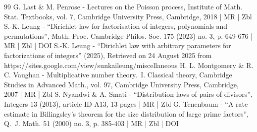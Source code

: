 \documentclass[10pt]{amsart}
\theoremstyle{plain}
\theoremstyle{definition}
\begin{document}
\begin{thebibliography}{99}
G. Last \& M. Penrose - Lectures on the Poisson process, Institute of Math. Stat. Textbooks, vol. 7, Cambridge University Press, Cambridge, 2018 | MR | Zbl
S.-K. Leung - “Dirichlet law for factorisation of integers, polynomials and permutations”, Math. Proc. Cambridge Philos. Soc. 175 (2023) no. 3, p. 649-676 | MR | Zbl | DOI
S.-K. Leung - “Dirichlet law with arbitrary parameters for factorizations of integers” (2025), Retrieved on 24 August 2025 from https://sites.google.com/view/sunkaileung/miscellaneous
H. L. Montgomery \& R. C. Vaughan - Multiplicative number theory. I. Classical theory, Cambridge Studies in Advanced Math., vol. 97, Cambridge University Press, Cambridge, 2007 | MR | Zbl
S. Nyandwi \& A. Smati - “Distribution laws of pairs of divisors”, Integers 13 (2013), article ID A13, 13 pages | MR | Zbl
G. Tenenbaum - “A rate estimate in Billingsley’s theorem for the size distribution of large prime factors”, Q. J. Math. 51 (2000) no. 3, p. 385-403 | MR | Zbl | DOI
\end{thebibliography}
\end{document}
